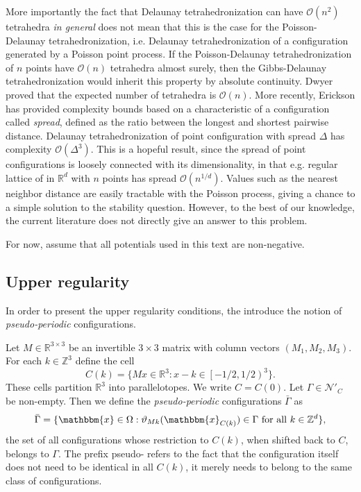 \documentclass[12pt,a4paper]{article}
\newcommand{\R}{{\mathbb R^3}}
\theoremstyle{definition}
\theoremstyle{remark}
\theoremstyle{theorem}
\newcommand{\x}{\mathbbm{x}}
\begin{document}
More importantly the fact that Delaunay tetrahedronization  can have $\mathcal O(n^2)$ tetrahedra \textit{in general} does not mean that this is the case for the Poisson-Delaunay tetrahedronization, i.e. Delaunay tetrahedronization of a configuration generated by a Poisson point process. If the Poisson-Delaunay tetrahedronization of $n$ points have $\mathcal O(n)$ tetrahedra almost surely, then the Gibbs-Delaunay tetrahedronization would inherit this property by absolute continuity. Dwyer \cite{Dwyer93} proved that the expected number of tetrahedra is $\mathcal O(n)$. More recently, Erickson has provided \cite{Erickson01}\cite{Erickson05} complexity bounds based on a characteristic of a configuration called \textit{spread}, defined as the ratio between the longest and shortest pairwise distance. Delaunay tetrahedronization of point configuration with spread $\Delta$ has complexity $\mathcal O(\Delta^3)$. This is a hopeful result, since the spread of point configurations is loosely connected with its dimensionality, in that e.g. regular lattice of in $\mathbb R^d$ with $n$ points has spread $\mathcal O(n^{1/d})$. Values such as the nearest neighbor distance are easily tractable with the Poisson process, giving a chance to a simple solution to the stability question. However, to the best of our knowledge, the current literature does not directly give an answer to this problem.


For now, assume that all potentials used in this text are non-negative.

\subsection{Upper regularity}

In order to present the upper regularity conditions, the introduce the notion of \textit{pseudo-periodic} configurations. 

Let $M\in\mathbb R^{3\times 3}$ be an invertible $3\times 3$ matrix with column vectors $(M_1,M_2,M_3)$. For each $k \in \mathbb Z^3$ define the cell
$$C(k) =  \{Mx \in \R: x-k \in \left[ -1/2, 1/2 \right)^3 \}.$$
These cells partition $\R$ into parallelotopes. We write $C=C(0)$. Let $\Gamma \in \mathcal N'_C$ be non-empty. Then we define the \textit{pseudo-periodic} configurations $\bar \Gamma$ as
$$\bar \Gamma = \{ \x \in \Omega: \vartheta_{Mk}(\x_{C(k)}) \in \Gamma \text{ for all } k \in \mathbb Z^d \},$$
the set of all configurations whose restriction to $C(k)$, when shifted back to $C$, belongs to $\Gamma$. The prefix pseudo- refers to the fact that the configuration itself does not need to be identical in all $C(k)$, it merely needs to belong to the same class of configurations.
\end{document}
